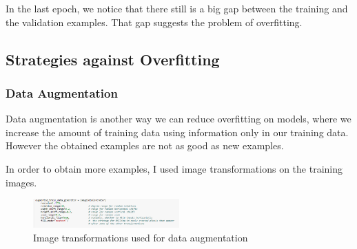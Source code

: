 \documentclass[a4paper,10pt]{article}
\begin{document}
\quad In the last epoch, we notice that there still is a big gap between the training and the validation examples. That gap suggests the problem of overfitting. 

  \subsection{Strategies against Overfitting}
  \subsubsection{Data Augmentation}
  
  \quad \quad Data augmentation is another way we can reduce overfitting on models, where we increase the amount of training data using information only in our training data. However the obtained examples are not as good as new examples. 
  
  \quad In order to obtain more examples, I used image transformations on the training images. 
  
   \begin{figure}[!htbp]
  	\centering
  	\includegraphics[width=0.5\textwidth]{augment.png}
  	\caption{Image transformations used for data augmentation}
  \end{figure}
  \vspace{5mm} %
  
\end{document}
